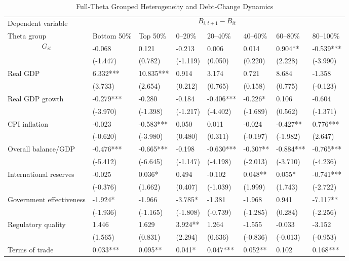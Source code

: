 \begin{table}[H]\centering
\begin{threeparttable}
\caption{Full-Theta Grouped Heterogeneity and Debt-Change Dynamics}
\label{tab:theta_group_heterogeneity_debt}
\scriptsize
\begin{tabularx}{\textwidth}{lYYYYYYY}
\toprule
Dependent variable &  \\
\cmidrule(lr){2-8}
Theta group & Bottom 50\% & Top 50\% & 0--20\% & 20--40\% & 40--60\% & 60--80\% & 80--100\% \\
\midrule
$$G_{it}$$ & -0.068 & 0.121 & -0.213 & 0.006 & 0.014 & 0.904** & -0.539*** \\
  & (-1.447) & (0.782) & (-1.119) & (0.050) & (0.220) & (2.228) & (-3.990) \\
Real GDP & 6.332*** & 10.835*** & 0.914 & 3.174 & 0.721 & 8.684 & -1.358 \\
  & (3.733) & (2.654) & (0.212) & (0.765) & (0.158) & (0.775) & (-0.123) \\
Real GDP growth & -0.279*** & -0.280 & -0.184 & -0.406*** & -0.226* & 0.106 & -0.604 \\
  & (-3.970) & (-1.398) & (-1.217) & (-4.402) & (-1.689) & (0.562) & (-1.371) \\
CPI inflation & -0.023 & -0.583*** & 0.050 & 0.011 & -0.024 & -0.427** & 0.776*** \\
  & (-0.620) & (-3.980) & (0.480) & (0.311) & (-0.197) & (-1.982) & (2.647) \\
Overall balance/GDP & -0.476*** & -0.665*** & -0.198 & -0.630*** & -0.307** & -0.884*** & -0.765*** \\
  & (-5.412) & (-6.645) & (-1.147) & (-4.198) & (-2.013) & (-3.710) & (-4.236) \\
International reserves & -0.025 & 0.036* & 0.494 & -0.102 & 0.048** & 0.055* & -0.741*** \\
  & (-0.376) & (1.662) & (0.407) & (-1.039) & (1.999) & (1.743) & (-2.722) \\
Government effectiveness & -1.924* & -1.966 & -3.785* & -1.381 & -1.968 & 0.941 & -7.117** \\
  & (-1.936) & (-1.165) & (-1.808) & (-0.739) & (-1.285) & (0.284) & (-2.256) \\
Regulatory quality & 1.446 & 1.629 & 3.924** & 1.264 & -1.555 & -0.033 & -3.152 \\
  & (1.565) & (0.831) & (2.294) & (0.636) & (-0.836) & (-0.013) & (-0.953) \\
Terms of trade & 0.033*** & 0.095** & 0.041* & 0.047*** & 0.052** & 0.102 & 0.168*** \\

\end{tabularx}
\end{threeparttable}
\end{table}
